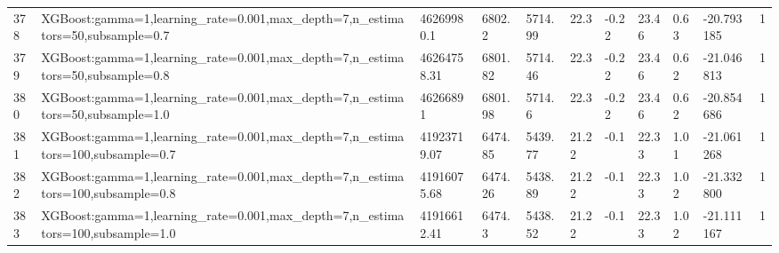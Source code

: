 \begin{longtable}{C{0.8cm} L{2cm} C{1.15cm} C{1.15cm} C{1.15cm} C{1.15cm} C{0.85cm} C{1.25cm} C{1.2cm} C{1.5cm} C{1.0cm}}
378 & XGBoost:\newline gamma=1,\newline learning\_rate=0.001,\newline max\_depth=7,\newline n\_estimators=50,\newline subsample=0.7 & 46269980.1 & 6802.2 & 5714.99 & 22.3 & -0.22 & 23.46 & 0.63 & -20.793185 & 1 \\
379 & XGBoost:\newline gamma=1,\newline learning\_rate=0.001,\newline max\_depth=7,\newline n\_estimators=50,\newline subsample=0.8 & 46264758.31 & 6801.82 & 5714.46 & 22.3 & -0.22 & 23.46 & 0.62 & -21.046813 & 1 \\
380 & XGBoost:\newline gamma=1,\newline learning\_rate=0.001,\newline max\_depth=7,\newline n\_estimators=50,\newline subsample=1.0 & 46266891 & 6801.98 & 5714.6 & 22.3 & -0.22 & 23.46 & 0.62 & -20.854686 & 1 \\
381 & XGBoost:\newline gamma=1,\newline learning\_rate=0.001,\newline max\_depth=7,\newline n\_estimators=100,\newline subsample=0.7 & 41923719.07 & 6474.85 & 5439.77 & 21.22 & -0.1 & 22.33 & 1.01 & -21.061268 & 1 \\
382 & XGBoost:\newline gamma=1,\newline learning\_rate=0.001,\newline max\_depth=7,\newline n\_estimators=100,\newline subsample=0.8 & 41916075.68 & 6474.26 & 5438.89 & 21.22 & -0.1 & 22.33 & 1.02 & -21.332800 & 1 \\
383 & XGBoost:\newline gamma=1,\newline learning\_rate=0.001,\newline max\_depth=7,\newline n\_estimators=100,\newline subsample=1.0 & 41916612.41 & 6474.3 & 5438.52 & 21.22 & -0.1 & 22.33 & 1.02 & -21.111167 & 1 \\

\end{longtable}

